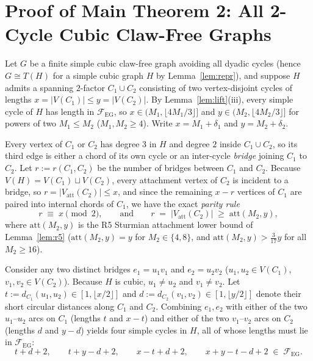 \documentclass[11pt,reqno]{amsart}
\theoremstyle{plain}
\theoremstyle{definition}
\theoremstyle{remark}
\newcommand{\FEG}{\mathcal{F}_{\mathrm{EG}}}
\newcommand{\Vatt}{V_{\mathrm{att}}}
\DeclareRobustCommand{\_}{\ifmmode\text{\textunderscore}\else\textunderscore\allowbreak\fi}
\begin{document}
\section{Proof of Main Theorem 2: All 2-Cycle Cubic Claw-Free Graphs}\label{sec:twocycle}

Let $G$ be a finite simple cubic claw-free graph avoiding all dyadic cycles (hence $G \cong T(H)$ for a simple cubic graph $H$ by Lemma~\ref{lem:repr}), and suppose $H$ admits a spanning $2$-factor $C_1 \cup C_2$ consisting of two vertex-disjoint cycles of lengths $x = |V(C_1)| \le y = |V(C_2)|$. By Lemma~\ref{lem:lift}(iii), every simple cycle of $H$ has length in $\FEG$, so $x \in (M_1, \lfloor 4M_1/3 \rfloor]$ and $y \in (M_2, \lfloor 4M_2/3 \rfloor]$ for powers of two $M_1 \le M_2$ ($M_1, M_2 \ge 4$). Write $x = M_1 + \delta_1$ and $y = M_2 + \delta_2$.

Every vertex of $C_1$ or $C_2$ has degree $3$ in $H$ and degree $2$ inside $C_1 \cup C_2$, so its third edge is either a chord of its own cycle or an inter-cycle \emph{bridge} joining $C_1$ to $C_2$. Let $r := r(C_1, C_2)$ be the number of bridges between $C_1$ and $C_2$. Because $V(H) = V(C_1) \sqcup V(C_2)$, every attachment vertex of $C_2$ is incident to a bridge, so $r = |\Vatt(C_2)| \le x$, and since the remaining $x - r$ vertices of $C_1$ are paired into internal chords of $C_1$, we have the exact \emph{parity rule}
\begin{equation}\label{eq:bridge-parity}
  r \;\equiv\; x \pmod{2}, \qquad\text{and}\qquad r \;=\; |\Vatt(C_2)| \;\ge\; \mathrm{att}(M_2, y),
\end{equation}
where $\mathrm{att}(M_2, y)$ is the R5 Sturmian attachment lower bound of Lemma~\ref{lem:r5} ($\mathrm{att}(M_2, y) = y$ for $M_2 \in \{4, 8\}$, and $\mathrm{att}(M_2, y) > \frac{3}{17} y$ for all $M_2 \ge 16$).

Consider any two distinct bridges $e_1 = u_1 v_1$ and $e_2 = u_2 v_2$ ($u_1, u_2 \in V(C_1)$, $v_1, v_2 \in V(C_2)$). Because $H$ is cubic, $u_1 \neq u_2$ and $v_1 \neq v_2$. Let $t := d_{C_1}(u_1, u_2) \in [1, \lfloor x/2 \rfloor]$ and $d := d_{C_2}(v_1, v_2) \in [1, \lfloor y/2 \rfloor]$ denote their short circular distances along $C_1$ and $C_2$. Combining $e_1, e_2$ with either of the two $u_1$--$u_2$ arcs on $C_1$ (lengths $t$ and $x - t$) and either of the two $v_1$--$v_2$ arcs on $C_2$ (lengths $d$ and $y - d$) yields four simple cycles in $H$, all of whose lengths must lie in $\FEG$:
\begin{equation}\label{eq:four-cycles}
  t + d + 2,\qquad t + y - d + 2,\qquad x - t + d + 2,\qquad x + y - t - d + 2 \;\in\; \FEG.
\end{equation}
\end{document}
